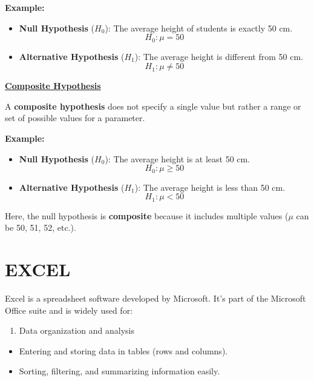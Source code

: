 \documentclass[
]{article}
\providecommand{\tightlist}{%
  \setlength{\itemsep}{0pt}\setlength{\parskip}{0pt}}
\begin{document}
\textbf{Example:}

\begin{itemize}
\item
  \textbf{Null Hypothesis} (\(H_0\)): The average height of students is
  exactly 50 cm.\\
  \[
  H_0: \mu = 50
  \]
\item
  \textbf{Alternative Hypothesis} (\(H_1\)): The average height is
  different from 50 cm.\\
  \[
  H_1: \mu \neq 50
  \]
\end{itemize}

\ul{\textbf{Composite Hypothesis}}

A \textbf{composite hypothesis} does not specify a single value but
rather a range or set of possible values for a parameter.

\textbf{Example:}

\begin{itemize}
\item
  \textbf{Null Hypothesis} (\(H_0\)): The average height is at least 50
  cm.\\
  \[
  H_0: \mu \geq 50
  \]
\item
  \textbf{Alternative Hypothesis} (\(H_1\)): The average height is less
  than 50 cm.\\
  \[
  H_1: \mu < 50
  \]
\end{itemize}

Here, the null hypothesis is \textbf{composite} because it includes
multiple values (\(\mu\) can be 50, 51, 52, etc.).

\newpage

\section{EXCEL}\label{excel}

Excel is a spreadsheet software developed by Microsoft. It's part of the
Microsoft Office suite and is widely used for:

\begin{enumerate}
\def\labelenumi{\arabic{enumi}.}
\tightlist
\item
  Data organization and analysis
\end{enumerate}

\begin{itemize}
\item
  Entering and storing data in tables (rows and columns).
\item
  Sorting, filtering, and summarizing information easily.
\end{itemize}
\end{document}
